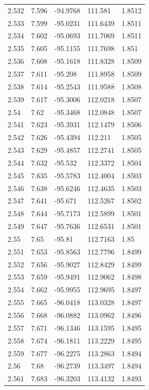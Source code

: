 \begin{tabular}{lllll}
2.532 & 7.596 & -94.9768 & 111.581 & 1.8512 \\
2.533 & 7.599 & -95.0231 & 111.6439 & 1.8511 \\
2.534 & 7.602 & -95.0693 & 111.7069 & 1.8511 \\
2.535 & 7.605 & -95.1155 & 111.7698 & 1.851 \\
2.536 & 7.608 & -95.1618 & 111.8328 & 1.8509 \\
2.537 & 7.611 & -95.208 & 111.8958 & 1.8509 \\
2.538 & 7.614 & -95.2543 & 111.9588 & 1.8508 \\
2.539 & 7.617 & -95.3006 & 112.0218 & 1.8507 \\
2.54 & 7.62 & -95.3468 & 112.0848 & 1.8507 \\
2.541 & 7.623 & -95.3931 & 112.1479 & 1.8506 \\
2.542 & 7.626 & -95.4394 & 112.211 & 1.8505 \\
2.543 & 7.629 & -95.4857 & 112.2741 & 1.8505 \\
2.544 & 7.632 & -95.532 & 112.3372 & 1.8504 \\
2.545 & 7.635 & -95.5783 & 112.4004 & 1.8503 \\
2.546 & 7.638 & -95.6246 & 112.4635 & 1.8503 \\
2.547 & 7.641 & -95.671 & 112.5267 & 1.8502 \\
2.548 & 7.644 & -95.7173 & 112.5899 & 1.8501 \\
2.549 & 7.647 & -95.7636 & 112.6531 & 1.8501 \\
2.55 & 7.65 & -95.81 & 112.7163 & 1.85 \\
2.551 & 7.653 & -95.8563 & 112.7796 & 1.8499 \\
2.552 & 7.656 & -95.9027 & 112.8429 & 1.8499 \\
2.553 & 7.659 & -95.9491 & 112.9062 & 1.8498 \\
2.554 & 7.662 & -95.9955 & 112.9695 & 1.8497 \\
2.555 & 7.665 & -96.0418 & 113.0328 & 1.8497 \\
2.556 & 7.668 & -96.0882 & 113.0962 & 1.8496 \\
2.557 & 7.671 & -96.1346 & 113.1595 & 1.8495 \\
2.558 & 7.674 & -96.1811 & 113.2229 & 1.8495 \\
2.559 & 7.677 & -96.2275 & 113.2863 & 1.8494 \\
2.56 & 7.68 & -96.2739 & 113.3497 & 1.8494 \\
2.561 & 7.683 & -96.3203 & 113.4132 & 1.8493 \\

\end{tabular}
